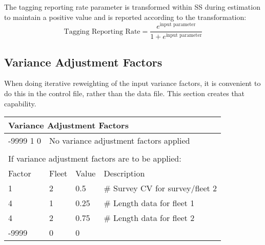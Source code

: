 \noindent The tagging reporting rate parameter is transformed within SS during estimation to maintain a positive value and is reported according to the transformation:
\begin{equation}
	\text{Tagging Reporting Rate} = \frac{e^{\text{input parameter}}}{1+e^{\text{input parameter}}}
\end{equation}

\hypertarget{GcompVar}{}
\subsection{Variance Adjustment Factors}
When doing iterative reweighting of the input variance factors, it is convenient to do this in the control file, rather than the data file.  This section creates that capability.


\begin{center}
	\begin{longtable}{p{3cm} p{3cm} p{3cm} p{6.5cm} }

		 \multicolumn{4}{l}{Variance Adjustment Factors }\\
		 \hline
		-9999 1 0 & \multicolumn{3}{l}{No variance adjustment factors applied }\\
		\\
		\multicolumn{4}{l}{If variance adjustment factors are to be applied:}\\
		\hline
		Factor & Fleet & Value & Description \\
		\hline
		1 & 2 & 0.5 & \# Survey CV for survey/fleet 2 \\
		4 & 1 & 0.25 & \# Length data for fleet 1 \\
		4 & 2 & 0.75 & \# Length data for fleet 2\\
		-9999 & 0 & 0 & \\
		\hline
	\end{longtable}
\end{center}

